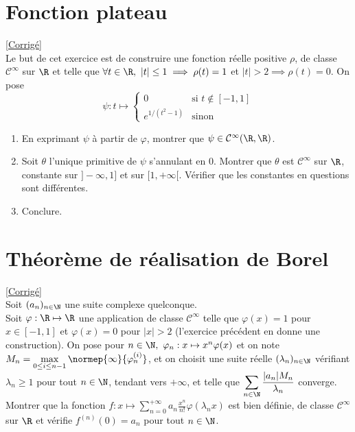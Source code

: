\documentclass{book}
\begin{document}
	\section{Fonction plateau}
	\textcolor{blue}{\hyperref[Fonction plateau corrigé]{[Corrigé]}}\\
	\label{Fonction plateau}
	Le but de cet exercice est de construire une fonction réelle positive $\rho$, de classe $\mathcal C^\infty$ sur $\R$ et telle que $\forall t\in \R,\ |t|\leq 1\implies \rho(t)=1$ et $|t|>2\implies \rho(t)=0$. On pose
	$$\psi:t\mapsto \begin{cases}
		0&\mbox{si }t\notin [-1,1]\\
		e^{1/(t^2-1)}&\mbox{sinon}
	\end{cases}$$
	\begin{enumerate}
		\item En exprimant $\psi$ à partir de $\varphi$, montrer que $\psi\in \mathcal C^\infty(\R,\R)$.
		\item Soit $\theta$ l'unique primitive de $\psi$ s'annulant en $0$. Montrer que $\theta$ est $\mathcal C^\infty$ sur $\R$, constante sur $]-\infty,1]$ et sur $[1,+\infty[$. Vérifier que les constantes en questions sont différentes.
		\item Conclure.
	\end{enumerate}
	
	\section{Théorème de réalisation de Borel }
	\textcolor{blue}{\hyperref[Théorème de réalisation de Borel corrigé]{[Corrigé]}}\\
	\label{Théorème de réalisation de Borel}
	Soit $(a_n)_{n\in \N}$ une suite complexe quelconque.
	\\Soit $\varphi:\R\mapsto\R$ une application de classe $\mathcal C^\infty$ telle que $\varphi(x)=1$ pour $x\in[-1,1]$ et $\varphi(x)=0$ pour $|x|>2$ (l'exercice précédent en donne une construction). On pose pour $n\in \N,\ \varphi_n:x\mapsto x^n\varphi(x)$ et on note $M_n=\max\limits_{0\leq i\leq n-1}\normep{\infty}{\varphi_n^{(i)}}$, et on choisit une suite réelle $(\lambda_n)_{n\in \N}$ vérifiant $\lambda_n\geq1$ pour tout $n\in\N$, tendant vers $+\infty$, et telle que $\displaystyle\sum\limits_{n\in \N}\frac{|a_n|M_n}{\lambda_n}$ converge.
	\\Montrer que la fonction $f:x\mapsto\displaystyle\sum\limits_{n=0}^{+\infty}a_n\frac{x^n}{n!}\varphi(\lambda_nx)$ est bien définie, de classe $\mathcal C^\infty$ sur $\R$ et vérifie $f^{(n)}(0)=a_n$ pour tout $n\in\N$.
	
\end{document}
